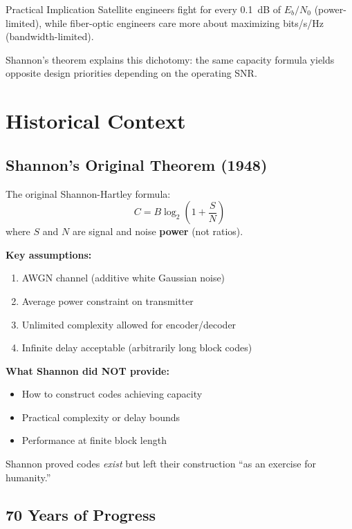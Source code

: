 \begin{calloutbox}{Practical Implication}
Satellite engineers fight for every 0.1~dB of $E_b/N_0$ (power-limited), while fiber-optic engineers care more about maximizing bits/s/Hz (bandwidth-limited).

Shannon's theorem explains this dichotomy: the same capacity formula yields opposite design priorities depending on the operating SNR.
\end{calloutbox}

\section{Historical Context}

\subsection{Shannon's Original Theorem (1948)}

The original Shannon-Hartley formula:
\begin{equation}
C = B \log_2\left(1 + \frac{S}{N}\right)
\end{equation}
where $S$ and $N$ are signal and noise \textbf{power} (not ratios).

\textbf{Key assumptions:}
\begin{enumerate}
\item AWGN channel (additive white Gaussian noise)
\item Average power constraint on transmitter
\item Unlimited complexity allowed for encoder/decoder
\item Infinite delay acceptable (arbitrarily long block codes)
\end{enumerate}

\textbf{What Shannon did NOT provide:}
\begin{itemize}
\item How to construct codes achieving capacity
\item Practical complexity or delay bounds
\item Performance at finite block length
\end{itemize}

Shannon proved codes \textit{exist} but left their construction ``as an exercise for humanity.''

\subsection{70 Years of Progress}

